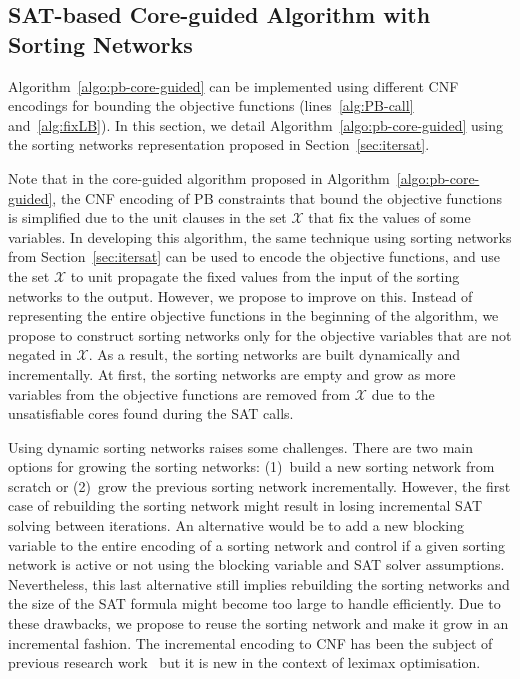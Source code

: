 \documentclass[a4paper,UKenglish,cleveref, autoref, thm-restate]{lipics-v2021}
\begin{document}
\subsection{SAT-based Core-guided Algorithm with Sorting Networks}
\label{sec:coreSAT}

Algorithm~\ref{algo:pb-core-guided} can be implemented using different CNF encodings for bounding the objective functions (lines~\ref{alg:PB-call} and~\ref{alg:fixLB}). In this section, we detail Algorithm~\ref{algo:pb-core-guided} using the sorting networks representation proposed in Section~\ref{sec:itersat}.

Note that in the core-guided algorithm proposed in Algorithm~\ref{algo:pb-core-guided}, the CNF encoding of PB constraints that bound the objective functions is simplified due to the unit clauses in the set $\mathcal{X}$ that fix the values of some variables. In developing this algorithm, the same technique using sorting networks from Section~\ref{sec:itersat} can be used to encode the objective functions, and use the set $\mathcal{X}$ to unit propagate the fixed values from the input of the sorting networks to the output.
However, we propose to improve on this. Instead of representing the entire objective functions in the beginning of the algorithm, we propose to construct sorting networks only for the objective variables that are not negated in $\mathcal{X}$. As a result, the sorting networks are built dynamically and incrementally. At first, the sorting networks are empty and grow as more variables from the objective functions are removed from $\mathcal{X}$ due to the unsatisfiable cores found during the SAT calls.

Using dynamic sorting networks raises some challenges. There are two main options for growing the sorting networks: (1)~build a new sorting network from scratch or (2)~grow the previous sorting network incrementally. 
However, the first case of rebuilding the sorting network might result in losing incremental SAT solving between iterations. An alternative would be to add a new blocking variable to the entire encoding of a sorting network and control if a given sorting network is active or not using the blocking variable and SAT solver assumptions.
Nevertheless, this last alternative still implies rebuilding the sorting networks and the size of the SAT formula might become too large to handle efficiently.
Due to these drawbacks, we propose to reuse the sorting network and make it grow in an incremental fashion. The incremental encoding to CNF has been the subject of previous research work~\cite{DBLP:journals/jsat/EenS06,DBLP:conf/cp/MartinsJML14} but it is new in the context of leximax optimisation.
\end{document}
